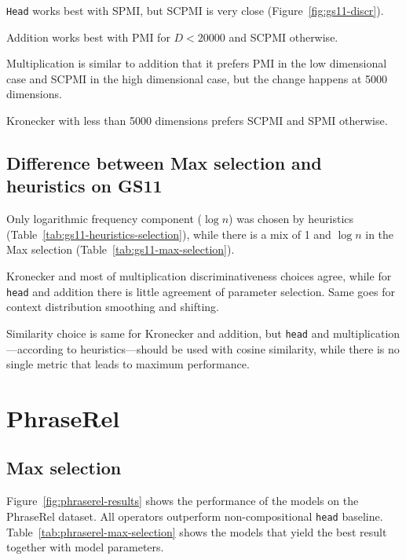 

\texttt{Head} works best with SPMI, but SCPMI is very close (Figure~\ref{fig:gs11-discr}).

Addition works best with PMI for $D < 20000$ and SCPMI otherwise.

Multiplication is similar to addition that it prefers PMI in the low dimensional case and SCPMI in the high dimensional case, but the change happens at 5000 dimensions.

Kronecker with less than 5000 dimensions prefers SCPMI and SPMI otherwise.


\subsection{Difference between Max selection and heuristics on GS11}

Only logarithmic frequency component ($\log n$) was chosen by heuristics (Table~\ref{tab:gs11-heuristics-selection}), while there is a mix of 1 and $\log n$ in the Max selection (Table~\ref{tab:gs11-max-selection}).

Kronecker and most of multiplication discriminativeness choices agree, while for \texttt{head} and addition there is little agreement of parameter selection. Same goes for context distribution smoothing and shifting.

Similarity choice is same for Kronecker and addition, but \texttt{head} and multiplication---according to heuristics---should be used with cosine similarity, while there is no single metric that leads to maximum performance.

\section{PhraseRel}
\label{sec:phraserel-experiment}

\subsection{Max selection}
\label{sec:max-selection-phraserel}



Figure~\ref{fig:phraserel-results} shows the performance of the models on the PhraseRel dataset. All operators outperform non-compositional \texttt{head} baseline. Table~\ref{tab:phraserel-max-selection} shows the models that yield the best result together with model parameters.


